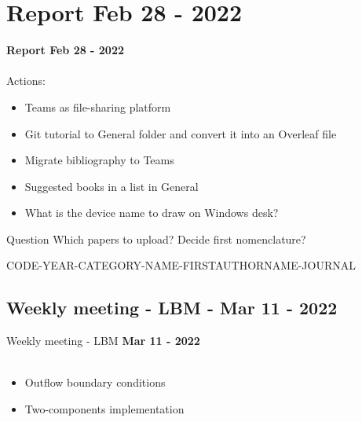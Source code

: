 \documentclass{beamer}
\begin{document}

	\section*{Report Feb 28 - 2022}
	\label{}
	\justifying
	\begin{frame}
		\textbf{Report Feb 28 - 2022}\\~\\
		Actions:
		\begin{itemize}
			\item Teams as file-sharing platform
			\item Git tutorial to General folder and convert it into an Overleaf file
			\item Migrate bibliography to Teams
			\item Suggested books in a list in General
			\item What is the device name to draw on Windows desk?
		\end{itemize}
	
	\begin{block}{Question}
		Which papers to upload? Decide first nomenclature?
	\end{block}

	CODE-YEAR-CATEGORY-NAME-FIRSTAUTHORNAME-JOURNAL
	\end{frame}


	
	\subsection{Weekly meeting - LBM - Mar 11 - 2022}
	\label{}
	\justifying
	\begin{frame}{Weekly meeting - LBM}
		\textbf{Mar 11 - 2022}\\~\\
		\begin{itemize}
			
			\item Outflow boundary conditions
			\item Two-components implementation

		\end{itemize}
	\end{frame}
	
\end{document}
